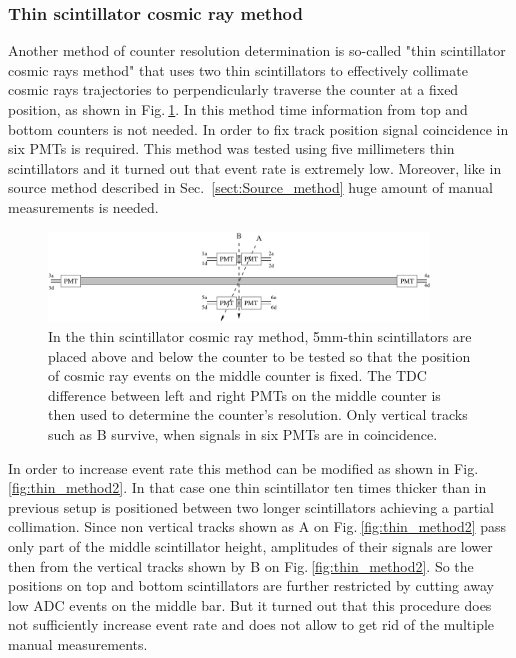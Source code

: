 \subsubsection{Thin scintillator cosmic ray method}
\label{sect:Thin_scintillator}

Another method of counter resolution determination is so-called "thin scintillator cosmic rays method" that uses two thin scintillators to effectively collimate cosmic rays
trajectories to perpendicularly traverse the counter at a fixed position, as shown in Fig.$\:$\ref{fig:thin_method1}. In this method time information from top and bottom counters is not needed. In order to fix track position signal coincidence  in six PMTs is required. This method was tested using five millimeters thin scintillators and it turned out that event rate is extremely low. Moreover, like in source method described in Sec.~\ref{sect:Source_method} huge amount of manual measurements is needed. 

\begin{figure}[]
\centering
\includegraphics[width=0.9\textwidth]{gleb/fig_gleb_thin_scintillator/thin_method1.pdf}
\caption{In the thin scintillator cosmic ray  method, 5mm-thin scintillators are placed above and below the
counter to be tested so that the position of cosmic ray events on the middle counter is fixed. The
TDC difference between left and right PMTs on the middle counter is then used to determine the
counter's resolution. Only vertical tracks such as B survive, when signals in six PMTs are in coincidence. \label{fig:thin_method1}}
\end{figure}

In order to increase event rate this method can be modified as shown in Fig.$\:$\ref{fig:thin_method2}. In that case one thin scintillator ten times thicker than in previous setup is positioned between two longer scintillators achieving a partial collimation. Since non vertical tracks shown as A on Fig.$\:$\ref{fig:thin_method2} pass only part of the middle scintillator height, amplitudes of their signals are lower  then from the vertical tracks shown by B on Fig.$\:$\ref{fig:thin_method2}. So the positions on top and bottom scintillators are further restricted by cutting away low ADC events on the middle bar. But it turned out that this procedure does not sufficiently increase event rate and does not allow to get rid of the multiple manual measurements.




